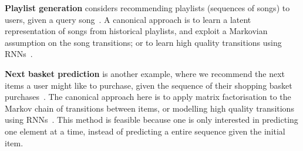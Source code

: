%


{\bf Playlist generation}
considers recommending playlists (\ie sequences of songs) to users, given a query song~\citep{McFee:2011,chen2012playlist,hidasi2015session}.
A canonical approach is to
learn a latent representation of songs from historical playlists,
and exploit a Markovian assumption on the song transitions;
or to learn high quality transitions using RNNs~\cite{choi2016towards}.


{\bf Next basket prediction}
is another example, %
where we recommend the next items a user might like to purchase, given the sequence of their shopping basket purchases~\citep{Rendle:2010,Wang:2015}.
The canonical approach here is to apply matrix factorisation to the Markov chain of transitions between items,
or modelling high quality transitions using RNNs~\cite{yu2016dynamic}.
This method is feasible because one is only interested in predicting %
one element at a time, instead of predicting a entire sequence given the initial item.



